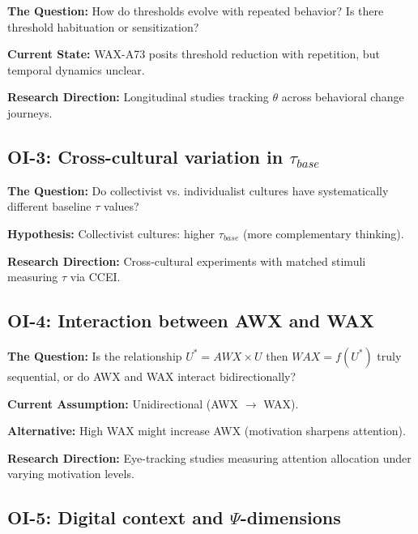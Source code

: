 \textbf{The Question:} How do thresholds evolve with repeated behavior? Is there threshold habituation or sensitization?

\textbf{Current State:} WAX-A73 posits threshold reduction with repetition, but temporal dynamics unclear.

\textbf{Research Direction:} Longitudinal studies tracking $\theta$ across behavioral change journeys.

\subsection{OI-3: Cross-cultural variation in $\tau_{base}$}

\textbf{The Question:} Do collectivist vs. individualist cultures have systematically different baseline $\tau$ values?

\textbf{Hypothesis:} Collectivist cultures: higher $\tau_{base}$ (more complementary thinking).

\textbf{Research Direction:} Cross-cultural experiments with matched stimuli measuring $\tau$ via CCEI.

\subsection{OI-4: Interaction between AWX and WAX}

\textbf{The Question:} Is the relationship $U^* = AWX \times U$ then $WAX = f(U^*)$ truly sequential, or do AWX and WAX interact bidirectionally?

\textbf{Current Assumption:} Unidirectional (AWX $\to$ WAX).

\textbf{Alternative:} High WAX might increase AWX (motivation sharpens attention).

\textbf{Research Direction:} Eye-tracking studies measuring attention allocation under varying motivation levels.

\subsection{OI-5: Digital context and $\Psi$-dimensions}

